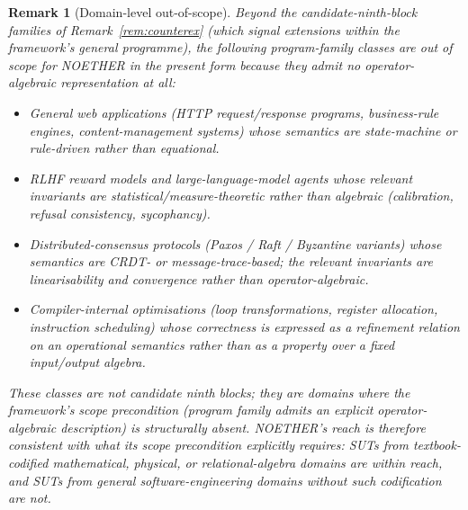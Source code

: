 \documentclass[acmsmall, screen]{acmart}
\newtheorem{remark}{Remark}
\begin{document}
\begin{remark}[Domain-level out-of-scope]
\label{rem:domain-out-of-scope}
Beyond the candidate-ninth-block families of Remark~\ref{rem:counterex} (which signal extensions \emph{within} the framework's general programme), the following program-family classes are out of scope for NOETHER in the present form because they admit no operator-algebraic representation at all:
\begin{itemize}
    \item \emph{General web applications} (HTTP request/response programs, business-rule engines, content-management systems) whose semantics are state-machine or rule-driven rather than equational.
    \item \emph{RLHF reward models and large-language-model agents} whose relevant invariants are statistical/measure-theoretic rather than algebraic (calibration, refusal consistency, sycophancy).
    \item \emph{Distributed-consensus protocols} (Paxos / Raft / Byzantine variants) whose semantics are CRDT- or message-trace-based; the relevant invariants are linearisability and convergence rather than operator-algebraic.
    \item \emph{Compiler-internal optimisations} (loop transformations, register allocation, instruction scheduling) whose correctness is expressed as a refinement relation on an operational semantics rather than as a property over a fixed input/output algebra.
\end{itemize}
These classes are not candidate ninth blocks; they are domains where the framework's scope precondition (program family admits an explicit operator-algebraic description) is structurally absent. NOETHER's reach is therefore consistent with what its scope precondition explicitly requires: SUTs from textbook-codified mathematical, physical, or relational-algebra domains are within reach, and SUTs from general software-engineering domains without such codification are not.
\end{remark}
\end{document}
